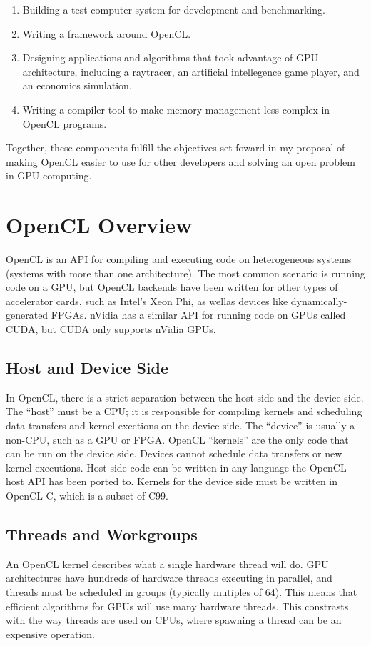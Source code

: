\documentclass{article}
\begin{document}
\begin{enumerate}
\item
Building a test computer system for development and benchmarking.
\item
Writing a framework around OpenCL.
\item 
Designing applications and algorithms that took advantage of GPU architecture, including a raytracer, an artificial intellegence game player, and an economics simulation.
\item
Writing a compiler tool to make memory management less complex in OpenCL programs.
\end{enumerate}

Together, these components fulfill the objectives set foward in my proposal of making OpenCL easier to use for other developers and solving an open problem in GPU computing.

\tableofcontents

\section{OpenCL Overview}
OpenCL is an API for compiling and executing code on heterogeneous systems (systems with more than one architecture). The most common scenario is running code on a GPU, but OpenCL backends have been written for other types of accelerator cards, such as Intel's Xeon Phi, as wellas devices like dynamically-generated FPGAs. nVidia has a similar API for running code on GPUs called CUDA, but CUDA only supports nVidia GPUs.


\subsection{Host and Device Side}
In OpenCL, there is a strict separation between the host side and the device side. The ``host'' must be a CPU; it is responsible for compiling kernels and scheduling data transfers and kernel exections on the device side. The ``device'' is usually a non-CPU, such as a GPU or FPGA. OpenCL ``kernels'' are the only code that can be run on the device side. Devices cannot schedule data transfers or new kernel executions. Host-side code can be written in any language the OpenCL host API has been ported to. Kernels for the device side must be written in OpenCL C, which is a subset of C99.

\subsection{Threads and Workgroups}
An OpenCL kernel describes what a single hardware thread will do. GPU architectures have hundreds of hardware threads executing in parallel, and threads must be scheduled in groups (typically mutiples of 64). This means that efficient algorithms for GPUs will use many hardware threads. This constrasts with the way threads are used on CPUs, where spawning a thread can be an expensive operation.
\end{document}
